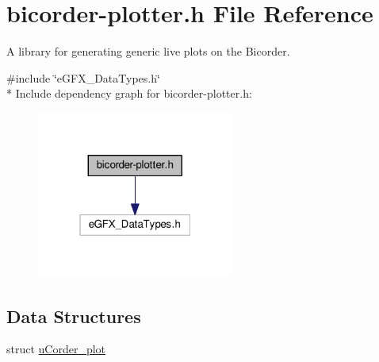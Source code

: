 \hypertarget{bicorder-plotter_8h}{}\section{bicorder-\/plotter.h File Reference}
\label{bicorder-plotter_8h}


A library for generating generic live plots on the Bicorder.  


{\ttfamily \#include \char`\"{}e\+G\+F\+X\+\_\+\+Data\+Types.\+h\char`\"{}}\\*
Include dependency graph for bicorder-\/plotter.h\+:
\nopagebreak
\begin{figure}[H]
\begin{center}
\leavevmode
\includegraphics[width=184pt]{bicorder-plotter_8h__incl}
\end{center}
\end{figure}
\subsection*{Data Structures}
\begin{DoxyCompactItemize}
\item 
struct \hyperlink{structuCorder__plot}{u\+Corder\+\_\+plot}
\end{DoxyCompactItemize}

